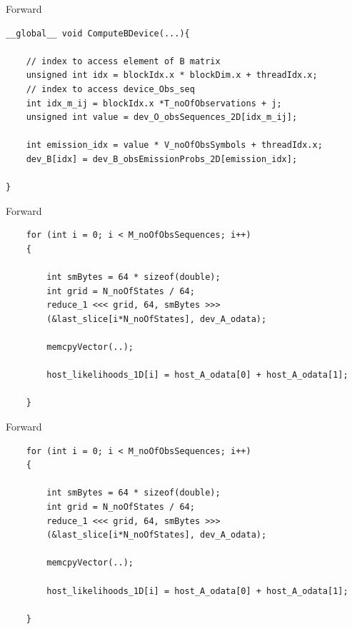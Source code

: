 \documentclass[11pt]{beamer}
\begin{document}
\begin{frame}[fragile]{Forward}
\begin{verbatim}
__global__ void ComputeBDevice(...){
	
	// index to access element of B matrix
	unsigned int idx = blockIdx.x * blockDim.x + threadIdx.x;
	// index to access device_Obs_seq
	int idx_m_ij = blockIdx.x *T_noOfObservations + j;
	unsigned int value = dev_O_obsSequences_2D[idx_m_ij];

	int emission_idx = value * V_noOfObsSymbols + threadIdx.x;
	dev_B[idx] = dev_B_obsEmissionProbs_2D[emission_idx];

}
\end{verbatim}
\end{frame}

\begin{frame}[fragile]{Forward}
\begin{verbatim}
	for (int i = 0; i < M_noOfObsSequences; i++)
	{

		int smBytes = 64 * sizeof(double);
		int grid = N_noOfStates / 64;
		reduce_1 <<< grid, 64, smBytes >>>
		(&last_slice[i*N_noOfStates], dev_A_odata);

		memcpyVector(..);

		host_likelihoods_1D[i] = host_A_odata[0] + host_A_odata[1];

	}
\end{verbatim}
\end{frame}


\begin{frame}[fragile]{Forward}
\begin{verbatim}
	for (int i = 0; i < M_noOfObsSequences; i++)
	{

		int smBytes = 64 * sizeof(double);
		int grid = N_noOfStates / 64;
		reduce_1 <<< grid, 64, smBytes >>>
		(&last_slice[i*N_noOfStates], dev_A_odata);

		memcpyVector(..);

		host_likelihoods_1D[i] = host_A_odata[0] + host_A_odata[1];

	}
\end{verbatim}
\end{frame}
\end{document}
